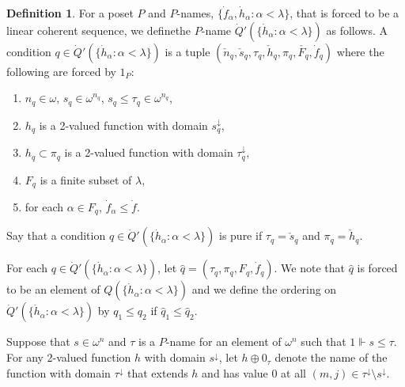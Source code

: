 \documentclass{amsart}
\theoremstyle{definition}
\newtheorem{definition}[thm]{Definition}
\theoremstyle{remark}
\begin{document}
\begin{definition} For a poset $P$ and   $P$-names, 
 $\{ \dot f_\alpha, \dot h_\alpha : \alpha < \lambda\}$,
 that is forced to be a linear coherent sequence, we define\label{Q'} 
 the $P$-name $\dot Q'(\{ \dot h_\alpha : \alpha < \lambda\})$ as
 follows. A condition $q\in 
 \dot Q'(\{ \dot h_\alpha : \alpha < \lambda\})$ is a tuple
  $( \check{n}_q, \check{s}_q, \tau_q, \check{h}_q, \pi_q, \check{F_q}, \dot f_q)$
  where the following are forced by $1_{P}$: 
  \begin{enumerate}
  \item  $n_q\in \omega$, $s_q   \in \omega^{n_q}$, $s_q\leq \tau_q\in \omega^{n_q}$,
  \item $h_q$ is a 2-valued function with domain $s_q^{\downarrow}$,
  \item $h_q\subset \pi_q$ is a 2-valued function with domain $\tau_q^{\downarrow}$,
  \item $F_q$ is a finite subset of $\lambda$,
  \item for each $\alpha\in F_q$, $\dot f_\alpha \leq \dot f$.
  \end{enumerate}
Say that a condition $q\in \dot Q'(\{ \dot h_\alpha : \alpha < \lambda\})$ 
is pure if $\tau_q = \check{s}_q $ and $\pi_q = \check{h}_q$.



For each $q\in \dot Q'(\{\dot h_\alpha :\alpha < \lambda\})$, 
  let $\hat q = ( \tau_q , \pi_q, F_q, \dot f_q)$.  We note that
   $\hat q$ is forced to be an element of $Q(\{ \dot h_\alpha :\alpha < \lambda\})$
   and we define the ordering on 
$    \dot Q'(\{\dot h_\alpha :\alpha < \lambda\})$ 
by $q_1 \leq q_2$ if 
  $\hat{q}_1 \leq \hat{q}_2 $.
\medskip

 Suppose that $s\in \omega^n$ and $\tau$ is a $P$-name for an
 element of $\omega^n$ such that $1\Vdash s\leq \tau$. 
 For any 2-valued function $h$ with domain $s^{\downarrow}$,
  let $h\oplus 0_{\tau}$ denote the name of the function with domain
   $\tau^{\downarrow}$ that extends $h$ and has value $0$
   at all $(m,j)\in \tau^{\downarrow}\setminus s^\downarrow$.
\end{definition}
\end{document}
